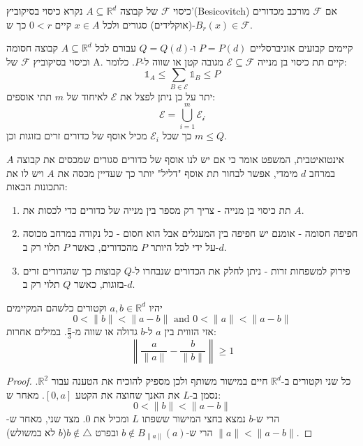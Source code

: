\documentclass{tstextbook}
\begin{document}
\begin{definition}
כיסוי \(\mathcal{F}\) של קבוצה \(A\subseteq \mathbb{R}^{d}\) נקרא כיסוי בסיקוביץ'(Besicovitch) אם \(\mathcal{F}\) מורכב מכדורים (אוקלידים) סגורים ולכל \(x \in A\) קיים \(0<r\) כך ש-\(B_{r}(x)\in \mathcal{F}\).

\end{definition}
\begin{theorem}
קיימים קבועים אוניברסליים \(P=P(d)\) ו-\(Q=Q(d)\) עבורם לכל \(A\subseteq \mathbb{R}^{d}\) קבוצה חסומה וכיסוי בסיקוביץ \(\mathcal{F}\) של A. קיים תת כיסוי בן מנייה \(\mathcal{E}\subseteq \mathcal{F}\) מגובה קטן או שווה ל-\(P\). כלומר:
$$\mathbb{1} _{A}\leq \sum_{B \in \mathcal{E} }\mathbb{1} _{B}\leq P$$
יתר על כן ניתן לפצל את \(\mathcal{E}\) לאיחוד של \(m\) תתי אוספים:
$$\mathcal{E} =\bigcup_{i=1}^{m}\mathcal{E_{i}} $$
כך שכל \(\mathcal{E}_{i}\) מכיל אוסף של כדורים זרים בזוגות וכן \(m\leq Q\).

\end{theorem}
\begin{remark}
אינטואיטבית, המשפט אומר כי אם יש לנו אוסף של כדורים סגורים שמכסים את קבוצה \(A\) במרחב \(d\) מימדי, אפשר לבחור תת אוסף "דליל" יותר כך שעדיין מכסה את \(A\) ויש לו את התכונות הבאות:

  \begin{enumerate}
    \item תת כיסוי בן מנייה - צריך רק מספר בין מנייה של כדורים כדי לכסות את \(A\). 


    \item חפיפה חסומה - אומנם יש חפיפה בין המעגלים אבל הוא חסום - כל נקודה במרחב מכוסה על ידי לכל היותר \(P\) מהכדורים, כאשר \(P\) תלוי רק ב-\(d\). 


    \item פירוק למשפחות זרות - ניתן לחלק את הכדורים שנבחרו ל-\(Q\) קבוצות כך שהגדורים זרים בזוגות, כאשר \(Q\) תלוי רק ב-\(d\). 


  \end{enumerate}
\end{remark}
\begin{lemma}
יהיו \(a,b \in \mathbb{R}^{d}\) וקטורים כלשהם המקיימים
$$0<\lVert b \rVert <\lVert a-b \rVert \text{ and }0<\lVert a \rVert <\lVert a - b\rVert $$
אזי הזווית בין \(a\) ל-\(b\) גדולה או שווה מ-\(\frac{\pi}{3}\). במילים אחרות:
$$\left\lVert  \frac{a}{\lVert a \rVert }-\frac{b}{\lVert b \rVert }  \right\rVert \geq 1$$

\end{lemma}
\begin{proof}
כל שני וקטורים ב-\(\mathbb{R}^{d}\) חיים במישור משותף ולכן מספיק להוכיח את הטענה עבור \(\mathbb{R}^{2}\). נסמן ב-\(L\) את האנך שחוצה את הקטע \([0,a]\). 
מאחר ש:
$$0<\lVert b \rVert <\lVert a-b \rVert $$
הרי ש-\(b\) נמצא בחצי המישור ששפתו \(L\) ומכיל את 0. מצד שני, מאחר ש-\(\lVert a \rVert<\lVert a-b \rVert\) הרי ש-\(b \not \in B_{\lVert a \rVert}(a)\) ובפרט \(b \not \in \triangle\)(\(b\) לא במשולש).

\end{proof}
\end{document}
